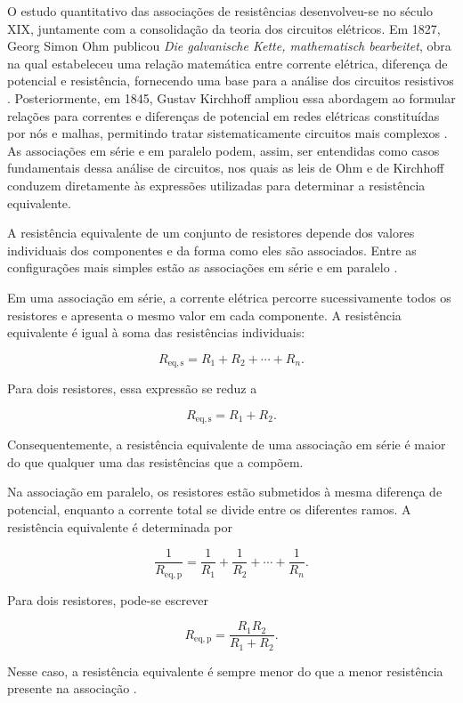 \documentclass[a4paper,12pt]{article}
\begin{document}
O estudo quantitativo das associações de resistências desenvolveu-se no
século XIX, juntamente com a consolidação da teoria dos circuitos elétricos.
Em 1827, Georg Simon Ohm publicou \textit{Die galvanische Kette,
mathematisch bearbeitet}, obra na qual estabeleceu uma relação matemática
entre corrente elétrica, diferença de potencial e resistência, fornecendo uma
base para a análise dos circuitos resistivos \cite{ohm1827}. Posteriormente,
em 1845, Gustav Kirchhoff ampliou essa abordagem ao formular relações para
correntes e diferenças de potencial em redes elétricas constituídas por nós
e malhas, permitindo tratar sistematicamente circuitos mais complexos
\cite{kirchhoff_hist}. As associações em série e em paralelo podem, assim,
ser entendidas como casos fundamentais dessa análise de circuitos, nos quais
as leis de Ohm e de Kirchhoff conduzem diretamente às expressões utilizadas
para determinar a resistência equivalente.

A resistência equivalente de um conjunto de resistores depende dos valores
individuais dos componentes e da forma como eles são associados. Entre as
configurações mais simples estão as associações em série e em paralelo
\cite{openstax_resistores}.

Em uma associação em série, a corrente elétrica percorre sucessivamente todos
os resistores e apresenta o mesmo valor em cada componente. A resistência
equivalente é igual à soma das resistências individuais:

\[
  R_{\mathrm{eq,s}}=R_1+R_2+\cdots+R_n.
\]

Para dois resistores, essa expressão se reduz a

\[
  R_{\mathrm{eq,s}}=R_1+R_2.
\]

Consequentemente, a resistência equivalente de uma associação em série é maior
do que qualquer uma das resistências que a compõem.

Na associação em paralelo, os resistores estão submetidos à mesma diferença de
potencial, enquanto a corrente total se divide entre os diferentes ramos. A
resistência equivalente é determinada por

\[
  \frac{1}{R_{\mathrm{eq,p}}}
  =
  \frac{1}{R_1}
  +
  \frac{1}{R_2}
  +\cdots+
  \frac{1}{R_n}.
\]

Para dois resistores, pode-se escrever

\[
  R_{\mathrm{eq,p}}
  =
  \frac{R_1R_2}{R_1+R_2}.
\]

Nesse caso, a resistência equivalente é sempre menor do que a menor resistência
presente na associação \cite{openstax_resistores}.
\end{document}
